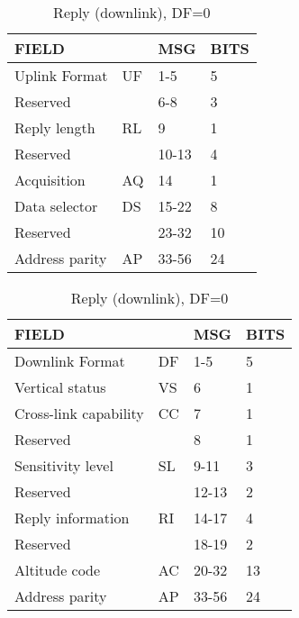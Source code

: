 \begin{table}[ht]
\caption{ACAS surveillance uplink and downlink messages}
\label{tb:acas_uf_df_0}

\begin{subtable}[t]{0.7\linewidth}
  \centering
  \caption{Interrogation (uplink), UF=0}
  \begin{tabular}[t]{|l|l|l|l|}
  \hline
  \textbf{FIELD} & \textbf{} & \textbf{MSG} & \textbf{BITS} \\ \hline
  Uplink Format & UF & 1-5 & 5 \\ \hline
  Reserved &  & 6-8 & 3 \\ \hline
  Reply length & RL & 9 & 1 \\ \hline
  Reserved &  & 10-13 & 4 \\ \hline
  Acquisition & AQ & 14 & 1 \\ \hline
  Data selector & DS & 15-22 & 8 \\ \hline
  Reserved &  & 23-32 & 10 \\ \hline
  Address parity & AP & 33-56 & 24 \\ \hline
  \end{tabular}
\end{subtable}%

\vspace{0.5cm}

\begin{subtable}[t]{0.7\linewidth}
  \centering
  \caption{Reply (downlink), DF=0}
  \begin{tabular}[t]{|l|l|l|l|}
  \hline
  \textbf{FIELD} & \textbf{} & \textbf{MSG} & \textbf{BITS} \\ \hline
  Downlink Format & DF & 1-5 & 5 \\ \hline
  Vertical status & VS & 6 & 1 \\ \hline
  Cross-link capability & CC & 7 & 1 \\ \hline
  Reserved &  & 8 & 1 \\ \hline
  Sensitivity level & SL & 9-11 & 3 \\ \hline
  Reserved &  & 12-13 & 2 \\ \hline
  Reply information & RI & 14-17 & 4 \\ \hline
  Reserved &  & 18-19 & 2 \\ \hline
  Altitude code & AC & 20-32 & 13 \\ \hline
  Address parity & AP & 33-56 & 24 \\ \hline
  \end{tabular}
\end{subtable}

\end{table}


